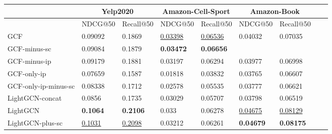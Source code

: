 \begin{table}[]
    \centering
    \begin{tabular}{|l|l|l|l|l|l|l|l|l|}
        \hline
                             & \multicolumn{2}{c|}{Yelp2020} & \multicolumn{2}{c|}{Amazon-Cell-Sport} & \multicolumn{2}{c|}{Amazon-Book}                                                                   \\ \hline
                             & NDCG@50                       & Recall@50                              & NDCG@50                          & Recall@50           & NDCG@50             & Recall@50           \\ \hline
        GCF                  & 0.09092                       & 0.1869                                 & \underline{0.03398}              & \underline{0.06536} & 0.04032             & 0.07035             \\ \hline
        GCF-minus-sc         & 0.09084                       & 0.1879                                 & \textbf{0.03472}                 & \textbf{0.06656}    &                     &                     \\ \hline
        GCF-minus-ip         & 0.09179                       & 0.1881                                 & 0.03197                          & 0.06294             & 0.03977             & 0.06998             \\ \hline
        GCF-only-ip          & 0.07659                       & 0.1587                                 & 0.01818                          & 0.03832             & 0.03765             & 0.06607             \\ \hline
        GCF-only-ip-minus-sc & 0.08338                       & 0.1712                                 & 0.02578                          & 0.05535             & 0.03777             & 0.06621             \\ \hline
        LightGCN-concat      & 0.0856                        & 0.1735                                 & 0.03029                          & 0.05707             & 0.03798             & 0.06519             \\ \hline
        LightGCN             & \textbf{0.1064}               & \textbf{0.2106}                        & 0.033                            & 0.06278             & \underline{0.04675} & \underline{0.08129} \\ \hline
        LightGCN-plus-sc     & \underline{0.1031}            & \underline{0.2098}                     & 0.03212                          & 0.06261             & \textbf{0.04679}    & \textbf{0.08175}    \\ \hline

\end{tabular}
\end{table}
